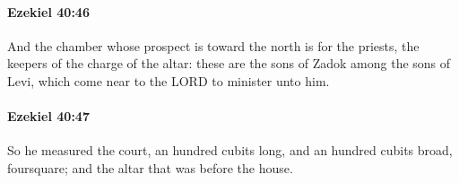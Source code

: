 		\paragraph{Ezekiel 40:46} %
			\label{EZEKIEL-40-46}

			And the chamber whose prospect is toward the north is for the priests, the keepers of the charge of the altar: these are the sons of Zadok among the sons of Levi, which come near to the LORD to minister unto him.


		\paragraph{Ezekiel 40:47} %
			\label{EZEKIEL-40-47}

			So he measured the court, an hundred cubits long, and an hundred cubits broad, foursquare; and the altar that was before the house.


